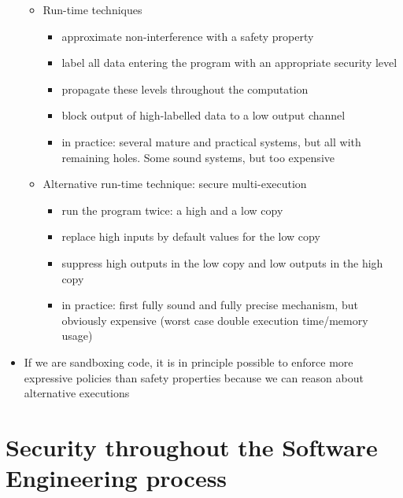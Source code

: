 \documentclass[12pt,titlepage,a4paper]{report}
\begin{document}
\begin{itemize}
\begin{itemize}
\begin{itemize}
					\end{itemize}
					\item Run-time techniques
					\begin{itemize}
						\item approximate non-interference with a safety property
						\item label all data entering the program with an appropriate security level
						\item propagate these levels throughout the computation
						\item block output of high-labelled data to a low output channel
						\item in practice: several mature and practical systems, but all with remaining holes. Some sound systems, but too expensive
					\end{itemize}
					\item Alternative run-time technique: secure multi-execution
					\begin{itemize}
						\item run the program twice: a high and a low copy
						\item replace high inputs by default values for the low copy
						\item suppress high outputs in the low copy and low outputs in the high copy
						\item in practice: first fully sound and fully precise mechanism, but obviously expensive (worst case double execution time/memory usage)
					\end{itemize}
				\end{itemize}
				\item If we are sandboxing code, it is in principle possible to enforce more expressive policies than safety properties because we can reason about alternative executions
			\end{itemize}

	\chapter{Security throughout the Software Engineering process}
\end{document}
